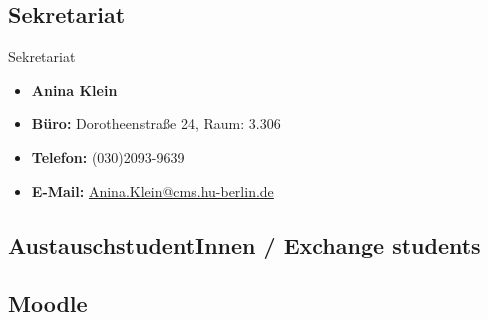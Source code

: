 %
\subsection{Sekretariat}

\begin{frame}{Sekretariat}
	
\begin{itemize}
	\item[] \textbf{Anina Klein}	
	\item \textbf{Büro:} Dorotheenstraße 24, Raum: 3.306
	\item \textbf{Telefon:} (030)2093-9639
	\item \textbf{E-Mail:} \href{mailto:Anina.Klein@cms.hu-berlin.de}{Anina.Klein@cms.hu-berlin.de}
\end{itemize}	

\end{frame}


\subsection{AustauschstudentInnen / Exchange students}


%
\subsection{Moodle}	

